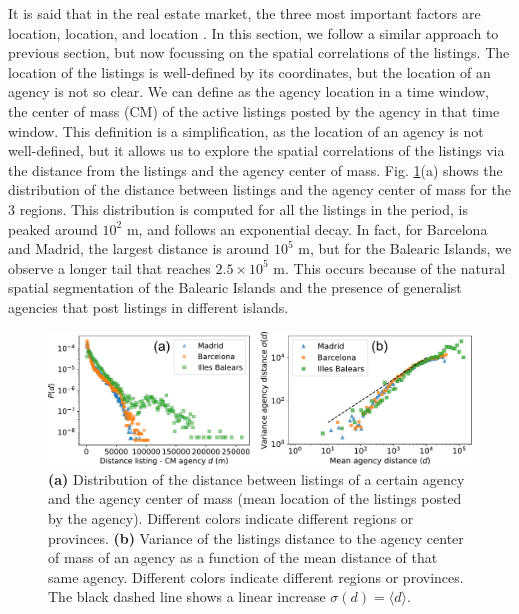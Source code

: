 It is said that in the real estate market, the three most important factors are location, location, and location \cite{}. In this section, we follow a similar approach to previous section, but now focussing on the spatial correlations of the listings. The location of the listings is well-defined by its coordinates, but the location of an agency is not so clear. We can define as the agency location in a time window, the center of mass (CM) of the active listings posted by the agency in that time window. This definition is a simplification, as the location of an agency is not well-defined, but it allows us to explore the spatial correlations of the listings via the distance from the listings and the agency center of mass. Fig. \ref{fig:distance_panel}(a) shows the distribution of the distance between listings and the agency center of mass for the 3 regions. This distribution is computed for all the listings in the period, is peaked around $10^2$ m, and follows an exponential decay. In fact, for Barcelona and Madrid, the largest distance is around $10^5$ m, but for the Balearic Islands, we observe a longer tail that reaches $2.5 \times 10^5$ m. This occurs because of the natural spatial segmentation of the Balearic Islands and the presence of generalist agencies that post listings in different islands.

\begin{figure}
    \centering
    \includegraphics[width =\textwidth]{Figs/Idealista_dynamics/distance_panel.pdf}
	\caption[Distance correlations.]{\textbf{(a)} Distribution of the distance between listings of a certain agency and the agency center of mass (mean location of the listings posted by the agency). Different colors indicate different regions or provinces. \textbf{(b)} Variance of the listings distance to the agency center of mass of an agency as a function of the mean distance of that same agency. Different colors indicate different regions or provinces. The black dashed line shows a linear increase $\sigma(d) = \langle d \rangle$. \label{fig:distance_panel}}
\end{figure}


